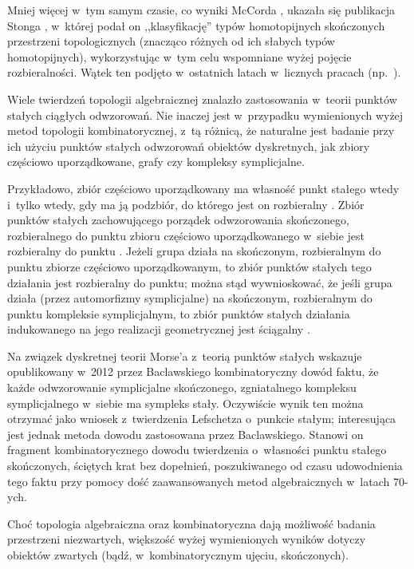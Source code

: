 Mniej więcej w~tym samym czasie, co wyniki McCorda \cite{McCord66}, ukazała się publikacja Stonga \cite{Stong66}, w~której podał on ,,klasyfikację'' typów homotopijnych skończonych przestrzeni topologicznych (znacząco różnych od ich słabych typów homotopijnych),  wykorzystując w~tym celu wspomniane wyżej pojęcie rozbieralności. Wątek ten podjęto w~ostatnich latach w~licznych pracach (np.~\cite{May,May08,May08a,May08b,Arenas99,Barmak07,Barmak08,Barmak08a,Barmak11,Barmak12}).

Wiele twierdzeń topologii algebraicznej znalazło zastosowania w~teorii punktów stałych ciągłych odwzorowań. Nie inaczej jest w~przypadku wymienionych wyżej metod topologii kombinatorycznej, z~tą różnicą, że naturalne jest badanie przy ich użyciu punktów stałych odwzorowań obiektów dyskretnych, jak zbiory częściowo uporządkowane, grafy czy kompleksy symplicjalne. 

Przykładowo, zbiór częściowo uporządkowany ma własność punkt stałego wtedy i~tylko wtedy, gdy ma ją podzbiór, do którego jest on rozbieralny \cite{Rival76}. Zbiór punktów stałych zachowującego porządek odwzorowania skończonego, rozbieralnego do punktu zbioru częściowo uporządkowanego w~siebie jest rozbieralny do punktu \cite{Duffus80a}. Jeżeli grupa działa na skończonym, rozbieralnym do punktu zbiorze częściowo uporządkowanym, to zbiór punktów stałych tego działania jest rozbieralny do punktu; można stąd wywnioskować, że jeśli grupa działa (przez automorfizmy symplicjalne) na skończonym, rozbieralnym do punktu kompleksie symplicjalnym, to zbiór punktów stałych działania indukowanego na jego realizacji geometrycznej jest ściągalny \cite{Barmak12,Hensel14}.

Na związek dyskretnej teorii Morse'a z~teorią punktów stałych wskazuje opublikowany w~2012 przez Baclawskiego \cite{Baclawski12} kombinatoryczny dowód faktu, że każde odwzorowanie symplicjalne skończonego, zgniatalnego kompleksu symplicjalnego w~siebie ma sympleks stały. Oczywiście wynik ten można otrzymać jako wniosek z~twierdzenia Lefschetza o~punkcie stałym; interesująca jest jednak metoda dowodu zastosowana przez Baclawskiego. Stanowi on fragment kombinatorycznego dowodu twierdzenia o~własności punktu stałego skończonych, ściętych krat bez dopełnień, poszukiwanego od czasu udowodnienia tego faktu przy pomocy dość zaawansowanych metod algebraicznych \cite{Baclawski77,Baclawski79} w~latach \mbox{70-ych}.

Choć topologia algebraiczna oraz kombinatoryczna dają możliwość badania przestrzeni niezwartych, większość wyżej wymienionych wyników dotyczy obiektów zwartych (bądź, w~kombinatorycznym ujęciu, skończonych). 

